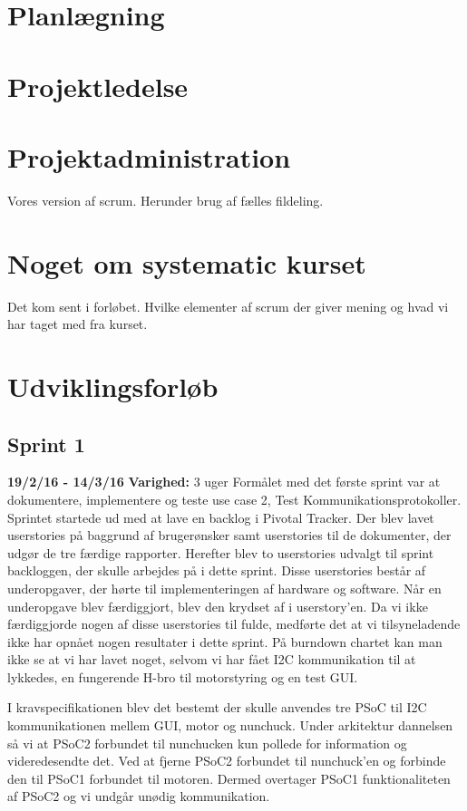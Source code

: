 \section{Planlægning}

\section{Projektledelse}

\section{Projektadministration}
Vores version af scrum.
Herunder brug af fælles fildeling.

\section{Noget om systematic kurset}
Det kom sent i forløbet. 
Hvilke elementer af scrum der giver mening og hvad vi har taget med fra kurset. 

\section{Udviklingsforløb}
	\subsection{Sprint 1}
	\textbf{19/2/16 - 14/3/16}\newline
	\textbf{Varighed:} 3 uger\newline
	Formålet med det første sprint var at dokumentere, implementere og teste use case 2, Test Kommunikationsprotokoller.
	Sprintet startede ud med at lave en backlog i Pivotal Tracker. Der blev lavet userstories på baggrund af brugerønsker samt userstories til de dokumenter, der udgør de tre færdige rapporter. Herefter blev to userstories udvalgt til sprint backloggen, der skulle arbejdes på i dette sprint. Disse userstories består af underopgaver, der hørte til implementeringen af hardware og software. Når en underopgave blev færdiggjort, blev den krydset af i userstory'en. Da vi ikke færdiggjorde nogen af disse userstories til fulde, medførte det at vi tilsyneladende ikke har opnået nogen resultater i dette sprint. På burndown chartet kan man ikke se at vi har lavet noget, selvom vi har fået I2C kommunikation til at lykkedes, en fungerende H-bro til motorstyring og en test GUI. \newline
	
	I kravspecifikationen blev det bestemt der skulle anvendes tre PSoC til I2C kommunikationen mellem GUI, motor og nunchuck. Under arkitektur dannelsen så vi at PSoC2 forbundet til nunchucken kun pollede for information og videredesendte det. Ved at fjerne PSoC2 forbundet til nunchuck'en og forbinde den til PSoC1 forbundet til motoren. Dermed overtager PSoC1 funktionaliteten af PSoC2 og vi undgår unødig kommunikation. \newline
	
